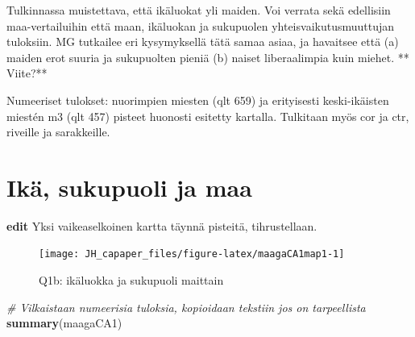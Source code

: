\documentclass[
  finnish,
]{book}
\newenvironment{Shaded}{\begin{snugshade}}{\end{snugshade}}
\newcommand{\CommentTok}[1]{\textcolor[rgb]{0.56,0.35,0.01}{\textit{#1}}}
\newcommand{\DataTypeTok}[1]{\textcolor[rgb]{0.13,0.29,0.53}{#1}}
\newcommand{\KeywordTok}[1]{\textcolor[rgb]{0.13,0.29,0.53}{\textbf{#1}}}
\newcommand{\NormalTok}[1]{#1}
\newcommand{\StringTok}[1]{\textcolor[rgb]{0.31,0.60,0.02}{#1}}
\begin{document}
Tulkinnassa muistettava, että ikäluokat yli maiden. Voi verrata sekä
edellisiin maa-vertailuihin että maan, ikäluokan ja sukupuolen
yhteisvaikutusmuuttujan tuloksiin. MG tutkailee eri kysymyksellä tätä
samaa asiaa, ja havaitsee että (a) maiden erot suuria ja sukupuolten
pieniä (b) naiset liberaalimpia kuin miehet. ** Viite?**

Numeeriset tulokset: nuorimpien miesten (qlt 659) ja erityisesti
keski-ikäisten miestén m3 (qlt 457) pisteet huonosti esitetty kartalla.
Tulkitaan myös cor ja ctr, riveille ja sarakkeille.

\hypertarget{ikuxe4-sukupuoli-ja-maa}{%
\section{Ikä, sukupuoli ja maa}\label{ikuxe4-sukupuoli-ja-maa}}

\begin{Shaded}
\end{Shaded}

\textbf{edit} Yksi vaikeaselkoinen kartta täynnä pisteitä,
tihrustellaan.

\begin{figure}

{\centering \texttt{[image: JH\_capaper\_files/figure-latex/maagaCA1map1-1]} 

}

\caption{Q1b: ikäluokka ja sukupuoli maittain}\label{fig:maagaCA1map1}
\end{figure}

\begin{Shaded}
\begin{Highlighting}[]
\CommentTok{# Vilkaistaan numeerisia tuloksia, kopioidaan tekstiin jos on tarpeellista}
\KeywordTok{summary}\NormalTok{(maagaCA1)}
\end{Highlighting}
\end{Shaded}
\end{document}
